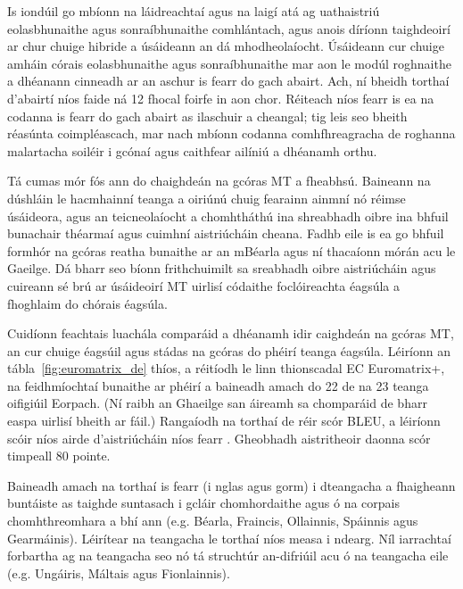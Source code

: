 \documentclass[]{../../metanetpaper}
\begin{document}
\begin{multicols}{2}
Is iondúil go mbíonn na láidreachtaí agus na laigí atá ag uathaistriú eolasbhunaithe agus sonraíbhunaithe comhlántach, agus anois díríonn taighdeoirí ar chur chuige hibride a úsáideann an dá mhodheolaíocht. Úsáideann cur chuige amháin córais eolasbhunaithe agus sonraíbhunaithe mar aon le modúl roghnaithe a dhéanann cinneadh ar an aschur is fearr do gach abairt. Ach, ní bheidh torthaí d'abairtí níos faide ná 12 fhocal foirfe in aon chor. Réiteach níos fearr is ea na codanna is fearr do gach abairt as ilaschuir a cheangal; tig leis seo bheith réasúnta coimpléascach, mar nach mbíonn codanna comhfhreagracha de roghanna malartacha soiléir i gcónaí agus caithfear ailíniú a dhéanamh orthu. 


Tá cumas mór fós ann do chaighdeán na gcóras MT a fheabhsú. Baineann na dúshláin le hacmhainní teanga a oiriúnú chuig fearainn ainmní nó réimse úsáideora, agus an teicneolaíocht a chomhtháthú ina shreabhadh oibre ina bhfuil bunachair théarmaí agus cuimhní aistriúcháin cheana. Fadhb eile is ea go bhfuil formhór na gcóras reatha bunaithe ar an mBéarla agus ní thacaíonn mórán acu le Gaeilge. Dá bharr seo bíonn frithchuimilt sa sreabhadh oibre aistriúcháin agus cuireann sé brú ar úsáideoirí MT uirlisí códaithe foclóireachta éagsúla a fhoghlaim do chórais éagsúla. 

Cuidíonn feachtais luachála comparáid a dhéanamh idir caighdeán na gcóras MT, an cur chuige éagsúil agus stádas na gcóras do phéirí teanga éagsúla. Léiríonn an tábla~\ref{fig:euromatrix_de} thíos, a réitíodh le linn thionscadal EC Euromatrix+, na feidhmíochtaí bunaithe ar phéirí a baineadh amach do 22 de na 23 teanga oifigiúil Eorpach. (Ní raibh an Ghaeilge san áireamh sa chomparáid de bharr easpa uirlisí bheith ar fáil.) Rangaíodh na torthaí de réir scór BLEU, a léiríonn scóir níos airde d’aistriúcháin níos fearr \cite{bleu1}. Gheobhadh aistritheoir daonna scór timpeall 80 pointe.

Baineadh amach na torthaí is fearr (i nglas agus gorm) i dteangacha a fhaigheann buntáiste as taighde suntasach i gcláir chomhordaithe agus ó na corpais chomhthreomhara a bhí ann (e.g. Béarla, Fraincis, Ollainnis, Spáinnis agus Gearmáinis). Léirítear na teangacha le torthaí níos measa i ndearg. Níl iarrachtaí forbartha ag na teangacha seo nó tá struchtúr an-difriúil acu ó na teangacha eile (e.g. Ungáiris, Máltais agus Fionlainnis).


\end{multicols}
\end{document}
